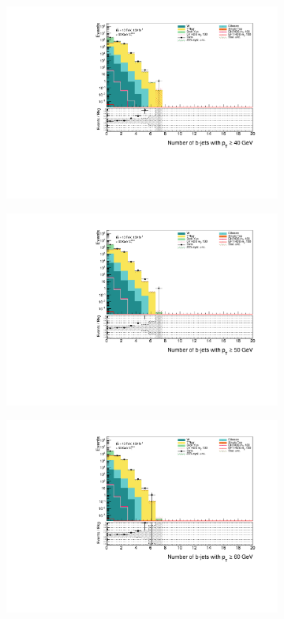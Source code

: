 \documentclass[12pt, a4paper]{book}
\begin{document}
\begin{figure}[!ht]
\begin{subfigure}[b]{0.49\textwidth}
        \centering
        \includegraphics[width=\textwidth]{bjetsPt40.pdf}
    \end{subfigure}
    \hfill\begin{subfigure}[b]{0.49\textwidth}
        \centering
        \includegraphics[width=\textwidth]{bjetsPt50.pdf}
    \end{subfigure}
    \hfill\begin{subfigure}[b]{0.49\textwidth}
        \centering
        \includegraphics[width=\textwidth]{bjetsPt60.pdf}

\end{subfigure}
\end{figure}
\end{document}
